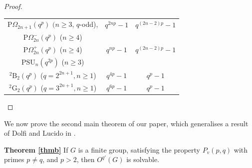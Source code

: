 \documentclass[11pt, a4paper]{article}
\numberwithin{equation}{section}
\theoremstyle{plain} %
\begin{document}
\begin{proof}
\begin{center}
\begin{tabular}{|c|c|c|}
$\mathrm{P}\Omega_{2n+1}(q^p)$ $(n\geq 3$, $q$-odd), &  $q^{2n p}-1$ & $q^{(2n-2)p}-1$  \\
$\mathrm{P}\Omega_{2n}^{-}(q^p)$ ($n\geq 4$) &  &  \\
\hline
$\mathrm{P}\Omega_{2 n}^{+}(q^p)$ ($n\geq 4$) & $q^{n p}-1$ & $q^{(2n-2)p}-1$ \\

$\mathrm{PSU}_n(q^{2p})$ ($n\geq 3$) &  & \\
\hline

${}^2\mathrm{B}_2(q^p)$ ($q=2^{2n+1},n\geq 1$) & $q^{4p}-1$ & $q^{p}-1$ \\
\hline
${}^2\mathrm{G}_2(q^p)$ ($q=3^{2n+1},n\geq 1$) & $q^{6p}-1$ & $q^{p}-1$ \\
\hline
\end{tabular}
\end{center}
\end{proof}

We now prove the second main theorem of our paper, which generalises a result of Dolfi and Lucido in \cite{MR1826493}. 

\vskip3mm
\noindent\textbf{Theorem \ref{thmb}} If $G$ is a finite group, satisfying the property $P_v(p,q)$ with primes $p\neq q$, and $p>2$, then $O^{q'}(G)$ is solvable.
 
\end{document}

